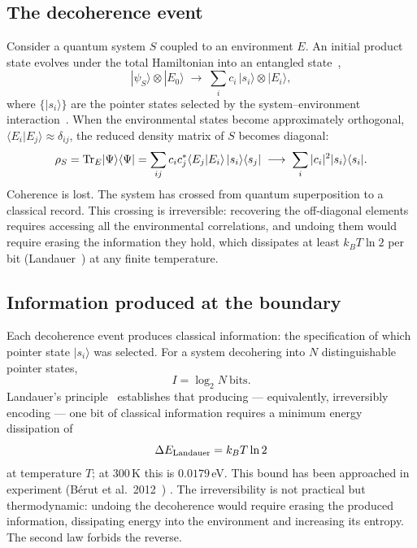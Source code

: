 \subsection{The decoherence event}
Consider a quantum system $S$ coupled to an environment $E$. An initial product state evolves under the total Hamiltonian into an entangled
state~\cite{Zurek2003},
\begin{equation}
|\psi_S\rangle\otimes|E_0\rangle\;\longrightarrow\;\sum_ic_i\,|s_i\rangle\otimes|E_i\rangle, \label{eq:law_entangle}
\end{equation}
where $\{|s_i\rangle\}$ are the pointer states selected by the system--environment interaction~\cite{Zurek2003}. When the environmental states become approximately
orthogonal, $\langle E_i|E_j\rangle\approx\delta_{ij}$, the reduced density matrix of $S$ becomes diagonal:
\begin{equation}
\rho_S={\rm Tr}_E|\Psi\rangle\langle\Psi|=\sum_{ij}c_ic_j^*\langle E_j|E_i\rangle\,|s_i\rangle\langle s_j|\;\longrightarrow\;\sum_i|c_i|^2|s_i\rangle\langle s_i|.
\label{eq:law_rhodiag}
\end{equation}
Coherence is lost. The system has crossed from quantum superposition to a classical record. This crossing is irreversible: recovering the off-diagonal
elements requires accessing all the environmental correlations, and undoing them would require erasing the information they hold, which dissipates at
least $k_BT\ln2$ per bit (Landauer~\cite{Landauer1961}) at any finite temperature. \derived

\subsection{Information produced at the boundary}
Each decoherence event produces classical information: the specification of which pointer state $|s_i\rangle$ was selected. For a system decohering into
$N$ distinguishable pointer states,
\begin{equation}
I=\log_2N\ \text{bits}. \label{eq:law_bits}
\end{equation}
Landauer's principle~\cite{Landauer1961} establishes that producing --- equivalently, irreversibly encoding --- one bit of classical information requires a minimum energy
dissipation of
\begin{equation}
\Delta E_{\rm Landauer}=k_BT\ln2 \label{eq:law_landauer}
\end{equation}
at temperature $T$; at 300\,K this is $0.0179$\,eV. This bound has been approached in experiment (B\'erut et al.\ 2012~\cite{Berut2012}) \observed. The
irreversibility is not practical but thermodynamic: undoing the decoherence would require erasing the produced information, dissipating energy into the
environment and increasing its entropy. The second law forbids the reverse.

